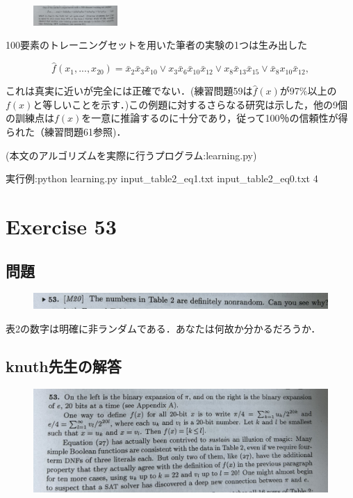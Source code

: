 \documentclass[dvipdfmx,a4paper,12pt]{jsarticle}
\begin{document}
 \begin{figure}[htbp]
  \centering
  \includegraphics[width=32mm,angle=270]{images/3-6.jpg}
  \end{figure}
  100要素のトレーニングセットを用いた筆者の実験の1つは生み出した
  
  \begin{equation}
\hat{f}(x_{1},...,x_{20}) = \bar{x}_{2}\bar{x}_{3}\bar{x}_{10} \lor x_{3}\bar{x}_{6}\bar{x}_{10}\bar{x}_{12} \lor x_{8}\bar{x}_{13}\bar{x}_{15} \lor \bar{x}_{8}x_{10}\bar{x}_{12}, 
\end{equation}  
  
これは真実に近いが完全には正確でない．(練習問題59は$\hat{f}(x)$が97\%以上の$f(x)$と等しいことを示す．)この例題に対するさらなる研究は示した，他の9個の訓練点は$f(x)$を一意に推論するのに十分であり，従って100％の信頼性が得られた（練習問題61参照)．



(本文のアルゴリズムを実際に行うプログラム:learning.py)

実行例:python learning.py input\_table2\_eq1.txt input\_table2\_eq0.txt 4
\newpage


\section*{Exercise 53}
\subsection*{問題}
 \begin{figure}[htbp]
  \centering
  \includegraphics[width=142mm,angle=0]{images/51.jpg}
  \end{figure}
 表2の数字は明確に非ランダムである．あなたは何故か分かるだろうか．
 \subsection*{knuth先生の解答}
  \begin{figure}[htbp]
  \centering
  \includegraphics[width=142mm,angle=0]{images/53_a.jpg}
  \end{figure}
  
\end{document}
